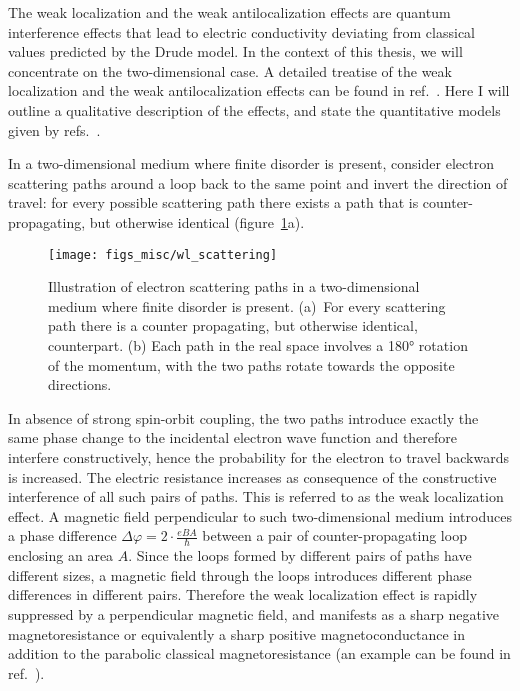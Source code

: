 The weak localization and the weak antilocalization effects are quantum interference effects that lead to electric conductivity deviating from classical values predicted by the Drude model. In the context of this thesis, we will concentrate on the two-dimensional case. A detailed treatise of the weak localization and the weak antilocalization effects can be found in ref.~\cite{bergmann1984}. Here I will outline a qualitative description of the effects, and state the quantitative models given by refs.~\cite{bergmann1984, anderson1979, WL_HLN, WAL_theory, WL_Khmel}.

In a two-dimensional medium where finite disorder is present, consider electron scattering paths around a loop back to the same point and invert the direction of travel: for every possible scattering path there exists a path that is counter-propagating, but otherwise identical (figure~\ref{fig:bg_scattering}a).%
\begin{figure}[ht]%
    \centering%
    \texttt{[image: figs\_misc/wl\_scattering]}%
    \caption[Electron scattering paths in two-dimensions.]{\label{fig:bg_scattering}Illustration of electron scattering paths in a two-dimensional medium where finite disorder is present. (a)~For every scattering path there is a counter propagating, but otherwise identical, counterpart. (b) Each path in the real space involves a \ang{180} rotation of the momentum, with the two paths rotate towards the opposite directions.}%
\end{figure}%

In absence of strong spin-orbit coupling, the two paths introduce exactly the same phase change to the incidental electron wave function and therefore interfere constructively, hence the probability for the electron to travel backwards is increased. The electric resistance increases as consequence of the constructive interference of all such pairs of paths. This is referred to as the weak localization effect. A magnetic field perpendicular to such two-dimensional medium introduces a phase difference $\Delta\varphi = 2\cdot\frac{eBA}{\hbar}$ between a pair of counter-propagating loop enclosing an area $A$. Since the loops formed by different pairs of paths have different sizes, a magnetic field through the loops introduces different phase differences in different pairs. Therefore the weak localization effect is rapidly suppressed by a perpendicular magnetic field, and manifests as a sharp negative magnetoresistance or equivalently a sharp positive magnetoconductance in addition to the parabolic classical magnetoresistance (an example can be found in ref.~\cite{bishop1982}).

